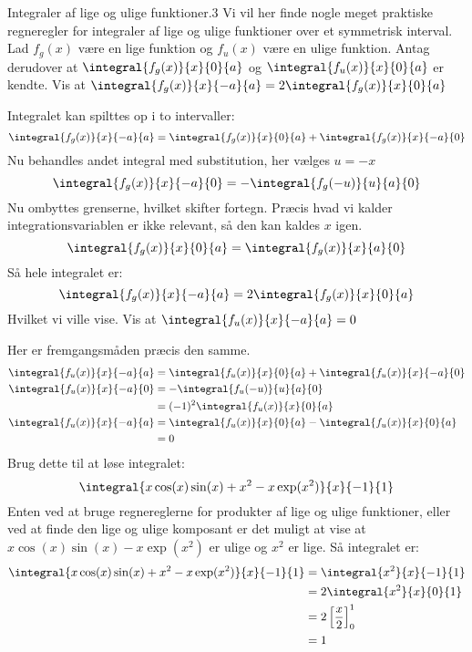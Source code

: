 \begin{opgave}{Integraler af lige og ulige funktioner.}{3}
Vi vil her finde nogle meget praktiske regneregler for integraler af lige og ulige funktioner over et symmetrisk interval.
Lad $f_g(x)$ være en lige funktion og $f_u(x)$ være en ulige funktion.
Antag derudover at $\integral{f_g(x)}{x}{0}{a}$ og $\integral{f_u(x)}{x}{0}{a}$ er kendte.
\opg Vis at $\integral{f_g(x)}{x}{-a}{a} = 2\integral{f_g(x)}{x}{0}{a}$

Integralet kan spilttes op i to intervaller:
$$
\integral{f_g(x)}{x}{-a}{a} = \integral{f_g(x)}{x}{0}{a}+\integral{f_g(x)}{x}{-a}{0}
$$
Nu behandles andet integral med substitution, her vælges $u=-x$
$$
\integral{f_g(x)}{x}{-a}{0} = -\integral{f_g(-u)}{u}{a}{0}
$$
Nu ombyttes grenserne, hvilket skifter fortegn. Præcis hvad vi kalder integrationsvariablen er ikke relevant, så den kan kaldes $x$ igen.
$$
\integral{f_g(x)}{x}{0}{a} = \integral{f_g(x)}{x}{a}{0}
$$
Så hele integralet er:
$$
\integral{f_g(x)}{x}{-a}{a} = 2\integral{f_g(x)}{x}{0}{a}
$$
Hvilket vi ville vise.
\opg Vis at $\integral{f_u(x)}{x}{-a}{a} = 0$

Her er fremgangsmåden præcis den samme.
\begin{align*}
    \integral{f_u(x)}{x}{-a}{a} &= \integral{f_u(x)}{x}{0}{a}+\integral{f_u(x)}{x}{-a}{0}\\
    \integral{f_u(x)}{x}{-a}{0} &= -\integral{f_u(-u)}{u}{a}{0}\\
    &= (-1)^2\integral{f_u(x)}{x}{0}{a}\\
    \integral{f_u(x)}{x}{-a}{a} &= \integral{f_u(x)}{x}{0}{a}-\integral{f_u(x)}{x}{0}{a}\\
    &=0
\end{align*}
\opg Brug dette til at løse integralet: $$\integral{x\cos(x)\sin(x)+x^2-x\exp(x^2)}{x}{-1}{1}$$
Enten ved at bruge regnereglerne for produkter af lige og ulige funktioner, eller ved at finde den lige og ulige komposant er det muligt at vise at $x\cos(x)\sin(x)-x\exp(x^2)$ er ulige og $x^2$ er lige. Så integralet er:
\begin{align*}
    \integral{x\cos(x)\sin(x)+x^2-x\exp(x^2)}{x}{-1}{1}&=\integral{x^2}{x}{-1}{1}\\
    &=2\integral{x^2}{x}{0}{1}\\
    &=2\left[\frac{x}{2}\right]_0^1\\
    &=1
\end{align*}
\end{opgave}


